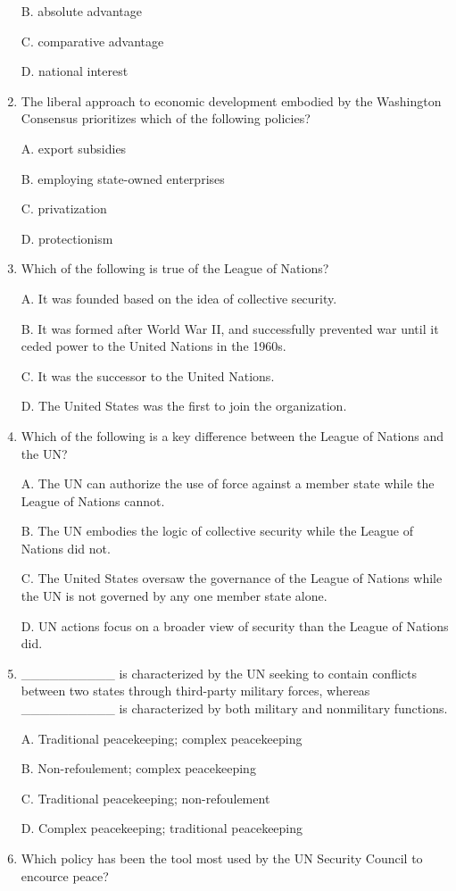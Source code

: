 \documentclass[
]{book}
\begin{document}
\begin{enumerate}
  B. absolute advantage

  C. comparative advantage

  D. national interest
\item
  The liberal approach to economic development embodied by the Washington Consensus prioritizes which of the following policies?

  A. export subsidies

  B. employing state-owned enterprises

  C. privatization

  D. protectionism
\item
  Which of the following is true of the League of Nations?

  A. It was founded based on the idea of collective security.

  B. It was formed after World War II, and successfully prevented war until it ceded power to the United Nations in the 1960s.

  C. It was the successor to the United Nations.

  D. The United States was the first to join the organization.
\item
  Which of the following is a key difference between the League of Nations and the UN?

  A. The UN can authorize the use of force against a member state while the League of Nations cannot.

  B. The UN embodies the logic of collective security while the League of Nations did not.

  C. The United States oversaw the governance of the League of Nations while the UN is not governed by any one member state alone.

  D. UN actions focus on a broader view of security than the League of Nations did.
\item
  \_\_\_\_\_\_\_\_\_\_ is characterized by the UN seeking to contain conflicts between two states through third-party military forces, whereas \_\_\_\_\_\_\_\_\_\_ is characterized by both military and nonmilitary functions.

  A. Traditional peacekeeping; complex peacekeeping

  B. Non-refoulement; complex peacekeeping

  C. Traditional peacekeeping; non-refoulement

  D. Complex peacekeeping; traditional peacekeeping
\item
  Which policy has been the tool most used by the UN Security Council to encource peace?


\end{enumerate}
\end{document}
